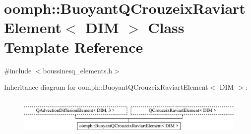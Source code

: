 \hypertarget{classoomph_1_1BuoyantQCrouzeixRaviartElement}{}\section{oomph\+:\+:Buoyant\+Q\+Crouzeix\+Raviart\+Element$<$ D\+IM $>$ Class Template Reference}
\label{classoomph_1_1BuoyantQCrouzeixRaviartElement}


{\ttfamily \#include $<$boussinesq\+\_\+elements.\+h$>$}

Inheritance diagram for oomph\+:\+:Buoyant\+Q\+Crouzeix\+Raviart\+Element$<$ D\+IM $>$\+:\begin{figure}[H]
\begin{center}
\leavevmode
\includegraphics[height=1.866667cm]{classoomph_1_1BuoyantQCrouzeixRaviartElement}
\end{center}
\end{figure}
